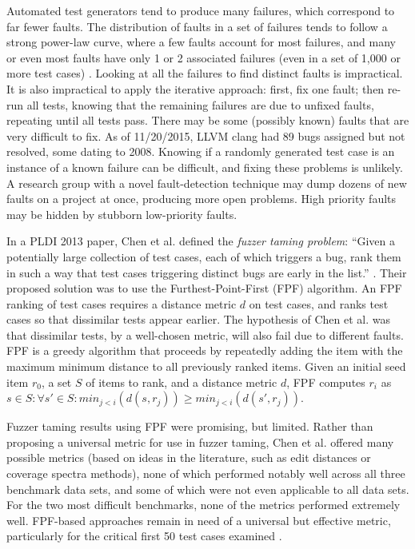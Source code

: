 Automated test generators tend to produce many failures, which correspond to far fewer faults.  The distribution of faults in a set of failures tends to follow a strong power-law curve, where a few faults account for most failures, and many or even most faults have only 1 or 2 associated failures (even in a set of 1,000 or more test cases) \cite{PLDI13}.  Looking at all the failures to find  distinct faults is impractical.  It is also impractical to apply the iterative approach:  first, fix one fault; then re-run all tests, knowing that the remaining failures are due to unfixed faults, repeating until all tests pass.  There may be some (possibly known) faults that are very difficult to fix. As of 11/20/2015, LLVM clang had 89 bugs assigned but not resolved, some dating to 2008.  Knowing if a randomly generated test case is an instance of a known failure can be difficult, and fixing these problems is unlikely.    A research group with a novel fault-detection technique \cite{csmith,ISSTA12,ZhendongPLDI} may dump dozens of new faults on a project at once, producing more open problems.   High priority faults may be hidden by stubborn low-priority faults.

In a PLDI 2013 paper, Chen et al. defined the \emph{fuzzer taming problem}: ``Given a potentially large collection of test cases, each of which triggers a bug, rank them in such a way that test cases triggering distinct bugs are early in the list.'' \cite{PLDI13}.  Their proposed solution was to use the Furthest-Point-First \cite{Gonzalez} (FPF) algorithm.  An FPF ranking of test cases requires a distance metric $d$ on test cases, and ranks test cases so that dissimilar tests appear earlier.  The hypothesis of Chen et al. was that dissimilar tests, by a well-chosen metric, will also fail due to different faults.
FPF is a greedy algorithm that proceeds by repeatedly adding the item with the maximum minimum distance to all previously ranked items. Given an initial seed item $r_0$, a set
$S$ of items to rank, and a distance metric $d$, FPF computes $r_i$ as $s \in S: \forall s' \in S: min_{ j < i}(d(s,r_j)) \geq min_{j < i}(d(s',r_j))$.

Fuzzer taming results using FPF were promising, but limited.  Rather than proposing a universal metric for use in fuzzer taming, Chen et al. offered many possible metrics (based on ideas in the literature, such as edit distances \cite{lev} or coverage spectra \cite{RepsSpectra} methods), none of which performed notably well across all three benchmark data sets, and some of which were not even applicable to all data sets.  For the two most difficult benchmarks, none of the metrics performed extremely well. FPF-based approaches remain in need of a universal but effective metric, particularly for the critical first 50 test cases examined \cite{PLDI13}.

